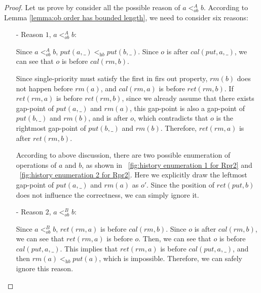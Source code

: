 \begin {proof}

Let us prove by consider all the possible reason of $a <_{\textit{ob}}^A b$. According to Lemma \ref{lemma:ob order has bounded length}, we need to consider six reasons: %

\begin{itemize}
\setlength{\itemsep}{0.5pt}
\item[-] Reason $1$, $a <_{\textit{ob}}^A b$:

    Since $a <_{\textit{ob}}^A b$, $\textit{put}(a,\_) <_{\textit{hb}} \textit{put}(b,\_)$. Since $o$ is after $\textit{cal}(\textit{put},a,\_)$, we can see that $o$ is before $\textit{cal}(\textit{rm},b)$.

    Since single-priority must satisfy the first in firs out property, $\textit{rm}(b)$ does not happen before $\textit{rm}(a)$, and $\textit{cal}(\textit{rm},a)$ is before $\textit{ret}(\textit{rm},b)$. If $\textit{ret}(\textit{rm},a)$ is before $\textit{ret}(\textit{rm},b)$, since we already assume that there exists gap-point of $\textit{put}(a,\_)$ and $\textit{rm}(a)$, this gap-point is also a gap-point of $\textit{put}(b,\_)$ and $\textit{rm}(b)$, and is after $o$, which contradicts that $o$ is the rightmost gap-point of $\textit{put}(b,\_)$ and $\textit{rm}(b)$. Therefore, $\textit{ret}(\textit{rm},a)$ is after $\textit{ret}(\textit{rm},b)$.

    According to above discussion, there are two possible enumeration of operations of $a$ and $b$, as shown in \figurename~\ref{fig:history enumeration 1 for Rpr2} and \figurename~\ref{fig:history enumeration 2 for Rpr2}. Here we explicitly draw the leftmost gap-point of $\textit{put}(a,\_)$ and $\textit{rm}(a)$ as $o'$. Since the position of $\textit{ret}(\textit{put},b)$ does not influence the correctness, we can simply ignore it.

\item[-] Reason $2$, $a <_{\textit{ob}}^B b$:

    Since $a <_{\textit{ob}}^B b$, $\textit{ret}(\textit{rm},a)$ is before $\textit{cal}(\textit{rm},b)$. Since $o$ is after $\textit{cal}(\textit{rm},b)$, we can see that $\textit{ret}(\textit{rm},a)$ is before $o$. Then, we can see that $o$ is before $\textit{cal}(\textit{put},a,\_)$. This implies that $\textit{ret}(\textit{rm},a)$ is before $\textit{cal}(\textit{put},a,\_)$, and then $\textit{rm}(a) <_{\textit{hb}} \textit{put}(a)$, which is impossible. Therefore, we can safely ignore this reason.


\end{itemize}
\end{proof}
